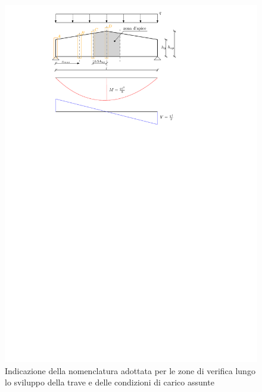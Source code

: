 \begin{pysub}[TraveDoppiaRastremazione]
\begin{figure}[H]
    \centering
    \includegraphics[]{IMG/TraveDoppiaRastremazione.pdf}
    \caption{Indicazione della nomenclatura adottata per le zone di verifica lungo lo sviluppo della trave e delle condizioni di carico assunte}
    \label{fig:TraveDoppiaRastremazione}
\end{figure}


\end{pysub}
